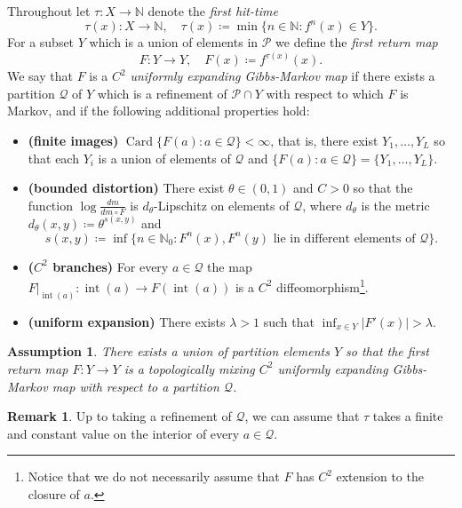 \documentclass[english, 10pt]{amsart}
\numberwithin{equation}{section}
\theoremstyle{definition}
\theoremstyle{plain}
\newtheorem{assumption}{Assumption}
\theoremstyle{plain}
\theoremstyle{definition}
\newtheorem{remark}[definition]{Remark}
\theoremstyle{definition}
\theoremstyle{plain}
\theoremstyle{definition}
\newcommand{\Card}{\operatorname{Card}}
\newcommand{\cP}{{\mathcal P}}
\newcommand{\cQ}{{\mathcal Q}}
\newcommand{\N}{{\mathbb N}}
\newcommand{\eqdef}{\coloneqq}
\newcommand{\bN}{\N}
\newcommand{\intr}{\operatorname{int}}
\numberwithin{equation}{section}
\begin{document}
Throughout let $\tau\colon X \to \N$ denote the \emph{first hit-time}
\[
	\tau(x) \colon X \to \N,\quad
	\tau (x) \eqdef \min \{ n \in\bN \colon f^n (x) \in Y \}.
\]	
For a subset $Y$ which is a union of elements in $\cP$ we define the \emph{first return map} 
\[
	F\colon Y \to Y,\quad 
	F(x) \eqdef f^{\tau(x)}(x).
\]	 
We say that $F$ is a $C^2$ \emph{uniformly expanding Gibbs-Markov map} if there exists a partition $\cQ$ of $Y$ which is a refinement of  $\cP \cap Y$  with respect to which $F$ is Markov, and if the following additional properties hold:
  \begin{itemize}[leftmargin=0.5cm ]
  \item \textbf{(finite images)} $\Card \{ F (a) \colon a \in \cQ \} < \infty$, that is, there exist $Y_1,\ldots, Y_L$ so that each $Y_i$ is a union of elements of $\cQ$ and $\{F(a)\colon a\in \cQ\} = \{ Y_1, \ldots, Y_L\}$.
  
  \item \textbf{(bounded distortion)} There exist $\theta \in (0,1)$ and $C > 0$ so that the function $\log \frac{ d m } { dm \circ F }$ is $d_\theta$-Lipschitz on elements of $\cQ$,
  where $d_{\theta}$ is the metric $d_{\theta} (x,y) \coloneqq \theta^{s(x,y)}$ and 
  \[
    s(x,y) \eqdef \inf \big\{ n \in\bN_0 \colon F^n(x), F^n(y) \text{ lie in different elements of }\cQ \big\}
    .
  \]
  \item \textbf{($C^{ 2 }$ branches)} For every $a\in\cQ$ the map $F|_{\intr(a)}\colon \intr(a) \to F(\intr(a))$ is a $C^{ 2 }$ diffeomorphism\footnote{Notice that we do not necessarily assume that $F$ has $C^{ 2 }$ extension to the closure of $a$.}.
  
  \item \textbf{(uniform expansion)} There exists $\lambda > 1$ such that $\inf_{ x\in  Y} |F'(x)|> \lambda$.
\end{itemize}

\begin{assumption}\label{asm:gm}
  There exists a union of partition elements $Y$ so that the first return map $F\colon Y \to Y$ is a topologically mixing $C^2$ uniformly expanding Gibbs-Markov map with respect to a partition $\cQ$.
\end{assumption}


\begin{remark}\label{rem:tau-constant-on-P}
  Up to taking a refinement of $\cQ$, we can assume that $\tau$ takes a finite and constant value on the interior of every $a\in \cQ$.
\end{remark}
\end{document}
